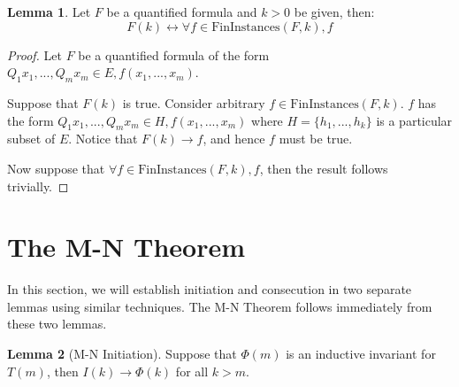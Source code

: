 \documentclass[12pt]{article}
\theoremstyle{definition}
\newtheorem{lemma}{Lemma}
\theoremstyle{remark}
\newcommand{\fininstances}{\text{FinInstances}}
\begin{document}
\begin{lemma}
  \label{ref:fin-instances}
  Let $F$ be a quantified formula and $k>0$ be given, then:
  $$F(k) \leftrightarrow \forall f \in \fininstances(F,k), f$$
\end{lemma}
\begin{proof}
  Let $F$ be a quantified formula of the form $Q_1 x_1,...,Q_m x_m \in E, f(x_1,...,x_m)$.

  Suppose that $F(k)$ is true.  Consider arbitrary $f \in \fininstances(F,k)$.  $f$ has the form $Q_1 x_1,...,Q_m x_m \in H, f(x_1,...,x_m)$ where $H = \{h_1,...,h_k\}$ is a particular subset of $E$.  Notice that $F(k) \rightarrow f$, and hence $f$ must be true.

  Now suppose that $\forall f \in \fininstances(F,k), f$, then the result follows trivially.
\end{proof}



\section{The M-N Theorem}

In this section, we will establish initiation and consecution in two separate lemmas using similar techniques.  The M-N Theorem follows immediately from these two lemmas.

\begin{lemma}[M-N Initiation]
  Suppose that $\Phi(m)$ is an inductive invariant for $T(m)$, then $I(k) \rightarrow \Phi(k)$ for all $k>m$.
\end{lemma}
\end{document}
